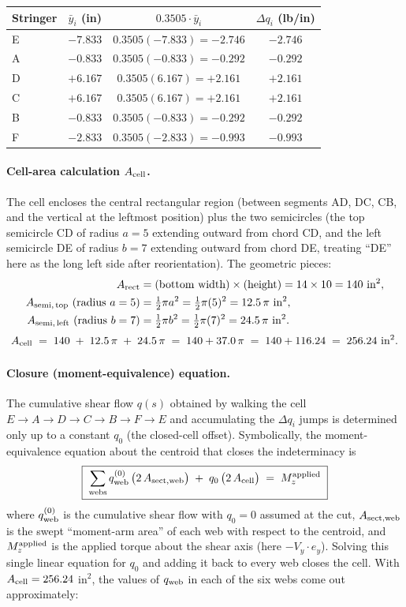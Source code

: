 \documentclass[11pt]{article}
\begin{document}
\begin{tabular}{lccc}
\toprule
Stringer & $\bar y_i$ (in) & $0.3505 \cdot \bar y_i$ & $\Delta q_i$ (lb/in)\\
\midrule
E & $-7.833$ & $0.3505(-7.833) = -2.746$ & $-2.746$\\
A & $-0.833$ & $0.3505(-0.833) = -0.292$ & $-0.292$\\
D & $+6.167$ & $0.3505(6.167)  = +2.161$ & $+2.161$\\
C & $+6.167$ & $0.3505(6.167)  = +2.161$ & $+2.161$\\
B & $-0.833$ & $0.3505(-0.833) = -0.292$ & $-0.292$\\
F & $-2.833$ & $0.3505(-2.833) = -0.993$ & $-0.993$\\
\bottomrule
\end{tabular}

\paragraph{Cell-area calculation $A_{\rm cell}$.} The cell encloses the central rectangular region (between segments AD, DC, CB, and the vertical at the leftmost position) plus the two semicircles (the top semicircle CD of radius $a = 5$ extending outward from chord CD, and the left semicircle DE of radius $b = 7$ extending outward from chord DE, treating ``DE'' here as the long left side after reorientation). The geometric pieces:
\begin{align*}
A_{\rm rect} &= \text{(bottom width)} \times \text{(height)} = 14 \times 10 = 140\ \text{in}^2,\\
A_{\rm semi,\,top}\ (\text{radius } a = 5) &= \tfrac{1}{2}\pi a^2 = \tfrac{1}{2}\pi (5)^2 = 12.5\,\pi\ \text{in}^2,\\
A_{\rm semi,\,left}\ (\text{radius } b = 7) &= \tfrac{1}{2}\pi b^2 = \tfrac{1}{2}\pi (7)^2 = 24.5\,\pi\ \text{in}^2.
\end{align*}
\[
A_{\rm cell} \;=\; 140 \;+\; 12.5\,\pi \;+\; 24.5\,\pi \;=\; 140 + 37.0\,\pi \;=\; 140 + 116.24 \;=\; 256.24\ \text{in}^2.
\]

\paragraph{Closure (moment-equivalence) equation.} The cumulative shear flow $q(s)$ obtained by walking the cell $E \to A \to D \to C \to B \to F \to E$ and accumulating the $\Delta q_i$ jumps is determined only up to a constant $q_0$ (the closed-cell offset). Symbolically, the moment-equivalence equation about the centroid that closes the indeterminacy is
\[
\boxed{\;\sum_{\rm webs} q_{\rm web}^{(0)}\,\bigl(2\,A_{{\rm sect},{\rm web}}\bigr) \;+\; q_0\,\bigl(2\,A_{\rm cell}\bigr) \;=\; M_{z}^{\rm applied}\;}
\]
where $q_{\rm web}^{(0)}$ is the cumulative shear flow with $q_0 = 0$ assumed at the cut, $A_{{\rm sect},{\rm web}}$ is the swept ``moment-arm area'' of each web with respect to the centroid, and $M_z^{\rm applied}$ is the applied torque about the shear axis (here $-V_y \cdot e_y$). Solving this single linear equation for $q_0$ and adding it back to every web closes the cell. With $A_{\rm cell} = 256.24$ in$^2$, the values of $q_{\rm web}$ in each of the six webs come out approximately:
\end{document}
